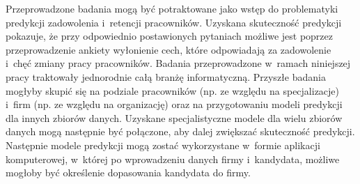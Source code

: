 Przeprowadzone badania mogą być potraktowane jako wstęp do problematyki predykcji zadowolenia i~retencji pracowników.
Uzyskana skuteczność predykcji pokazuje, że przy odpowiednio postawionych pytaniach możliwe jest poprzez przeprowadzenie ankiety wyłonienie cech, które odpowiadają za zadowolenie i~chęć zmiany pracy pracowników.
Badania przeprowadzone w~ramach niniejszej pracy traktowały jednorodnie całą branżę informatyczną.
Przyszłe badania mogłyby skupić się na podziale pracowników (np. ze względu na specjalizacje) i~firm (np. ze względu na organizację) oraz na przygotowaniu modeli predykcji dla innych zbiorów danych.
Uzyskane specjalistyczne modele dla wielu zbiorów danych mogą następnie być połączone, aby dalej zwiększać skuteczność predykcji.
Następnie modele predykcji mogą zostać wykorzystane w~formie aplikacji komputerowej, w~której po wprowadzeniu danych firmy i~kandydata, możliwe mogłoby być określenie dopasowania kandydata do firmy.



\thispagestyle{normal}
